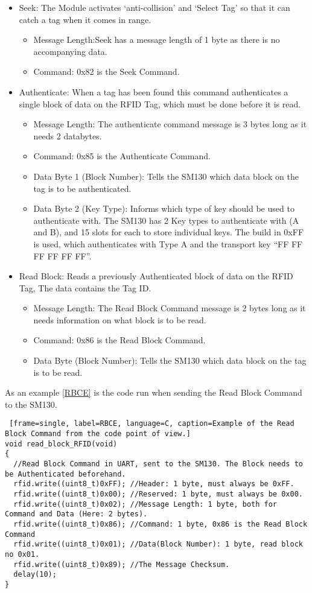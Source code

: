 \begin{itemize}
	\item Seek: The Module activates `anti-collision' and `Select Tag' so that it can catch a tag when it comes in range.
	\begin{itemize}
		\item Message Length:Seek has a message length of 1 byte as there is no accompanying data.
		\item Command: 0x82 is the Seek Command.
	\end{itemize}
	\item Authenticate: When a tag has been found this command authenticates a single block of data on the RFID Tag, which must be done before it is read.
	\begin{itemize}
		\item Message Length: The authenticate command message is 3 bytes long as it needs 2 databytes.
		\item Command: 0x85 is the Authenticate Command.
		\item Data Byte 1 (Block Number): Tells the SM130 which data block on the tag is to be authenticated.
		\item Data Byte 2 (Key Type): Informs which type of key should be used to authenticate with. The SM130 has 2 Key types to authenticate with (A and B), and 15 slots for each to store individual keys. The build in 0xFF is used, which authenticates with Type A and the transport key ``FF FF FF FF FF FF''.
	\end{itemize}
	\item Read Block: Reads a previously Authenticated block of data on the RFID Tag, The data contains the Tag ID.
	\begin{itemize}
		\item Message Length: The Read Block Command message is 2 bytes long as it needs information on what block is to be read.
		\item Command: 0x86 is the Read Block Command.
		\item Data Byte (Block Number): Tells the SM130 which data block on the tag is to be read.
	\end{itemize}
\end{itemize}

As an example \autoref{RBCE} is the code run when sending the Read Block Command to the SM130.
\begin{lstlisting} [frame=single, label=RBCE, language=C, caption=Example of the Read Block Command from the code point of view.]
void read_block_RFID(void)
{
  //Read Block Command in UART, sent to the SM130. The Block needs to be Authenticated beforehand.
  rfid.write((uint8_t)0xFF); //Header: 1 byte, must always be 0xFF.
  rfid.write((uint8_t)0x00); //Reserved: 1 byte, must always be 0x00.  
  rfid.write((uint8_t)0x02); //Message Length: 1 byte, both for Command and Data (Here: 2 bytes).
  rfid.write((uint8_t)0x86); //Command: 1 byte, 0x86 is the Read Block Command
  rfid.write((uint8_t)0x01); //Data(Block Number): 1 byte, read block no 0x01. 
  rfid.write((uint8_t)0x89); //The Message Checksum.
  delay(10); 
}													
\end{lstlisting}


